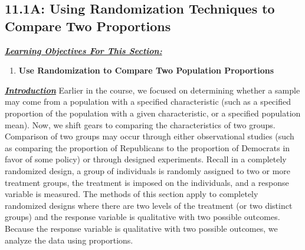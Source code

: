 \documentclass{report}
\begin{document}
    \subsection*{11.1A: Using Randomization Techniques to Compare Two Proportions}
    \bigbreak \noindent 
    \bigbreak \noindent 
    \textbf{\textit{\underline{Learning Objectives For This Section:}}}
    \begin{enumerate}
        \item \textbf{Use Randomization to Compare Two Population Proportions}
    \end{enumerate}
    \bigbreak \noindent \bigbreak \noindent 
    \textbf{\textit{\underline{Introduction}}}
    \bigbreak \noindent 
    Earlier in the course, we focused on determining whether a sample may come from a population with a specified characteristic (such as a specified proportion of the population with a given characteristic, or a specified population mean).
    \bigbreak \noindent 
    Now, we shift gears to comparing the characteristics of two groups. Comparison of two groups may occur through either observational studies (such as comparing the proportion of Republicans to the proportion of Democrats in favor of some policy) or through designed experiments. Recall in a completely randomized design, a group of individuals is randomly assigned to two or more treatment groups, the treatment is imposed on the individuals, and a response variable is measured. The methods of this section apply to completely randomized designs where there are two levels of the treatment (or two distinct groups) and the response variable is qualitative with two possible outcomes. Because the response variable is qualitative with two possible outcomes, we analyze the data using proportions.
\end{document}
